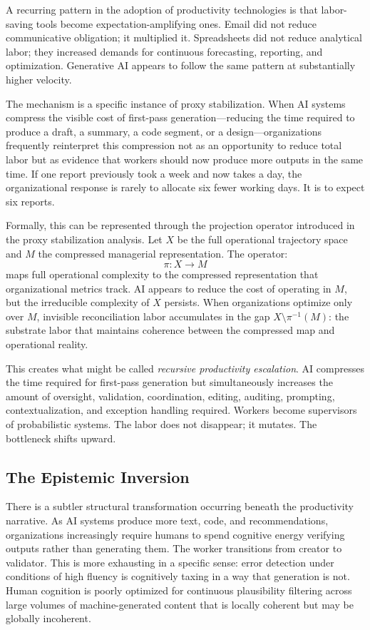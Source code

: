 \claimP A recurring pattern in the adoption of productivity technologies is that
labor-saving tools become expectation-amplifying ones. Email did not reduce
communicative obligation; it multiplied it. Spreadsheets did not reduce
analytical labor; they increased demands for continuous forecasting, reporting,
and optimization. Generative AI appears to follow the same pattern at
substantially higher velocity.

The mechanism is a specific instance of proxy stabilization. When AI systems
compress the visible cost of first-pass generation---reducing the time required
to produce a draft, a summary, a code segment, or a design---organizations
frequently reinterpret this compression not as an opportunity to reduce total
labor but as evidence that workers should now produce more outputs in the same
time. If one report previously took a week and now takes a day, the organizational
response is rarely to allocate six fewer working days. It is to expect six reports.

Formally, this can be represented through the projection operator introduced in
the proxy stabilization analysis. Let $X$ be the full operational trajectory
space and $M$ the compressed managerial representation. The operator:
\[
  \pi: X \to M
\]
maps full operational complexity to the compressed representation that
organizational metrics track. AI appears to reduce the cost of operating in $M$,
but the irreducible complexity of $X$ persists. When organizations optimize only
over $M$, invisible reconciliation labor accumulates in the gap $X \setminus
\pi^{-1}(M)$: the substrate labor that maintains coherence between the compressed
map and operational reality.

\claimP This creates what might be called \emph{recursive productivity escalation}.
AI compresses the time required for first-pass generation but simultaneously
increases the amount of oversight, validation, coordination, editing, auditing,
prompting, contextualization, and exception handling required. Workers become
supervisors of probabilistic systems. The labor does not disappear; it mutates.
The bottleneck shifts upward.

\subsection{The Epistemic Inversion}

There is a subtler structural transformation occurring beneath the productivity
narrative. As AI systems produce more text, code, and recommendations,
organizations increasingly require humans to spend cognitive energy verifying
outputs rather than generating them. The worker transitions from creator to
validator. This is more exhausting in a specific sense: error detection under
conditions of high fluency is cognitively taxing in a way that generation is
not. Human cognition is poorly optimized for continuous plausibility filtering
across large volumes of machine-generated content that is locally coherent but
may be globally incoherent.

